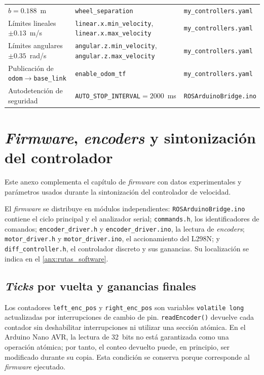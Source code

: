 \begin{appendices}
\begin{table}[H]
\begin{tabular}{p{3.5cm} p{6.3cm} p{4.1cm}}
$b=0.188$~m &
\texttt{wheel\_separation} &
\texttt{my\_controllers.yaml} \\

Límites lineales $\pm0.13$~m/s &
\texttt{linear.x.min\_velocity}, \texttt{linear.x.max\_velocity} &
\texttt{my\_controllers.yaml} \\

Límites angulares $\pm0.35$~rad/s &
\texttt{angular.z.min\_velocity}, \texttt{angular.z.max\_velocity} &
\texttt{my\_controllers.yaml} \\

Publicación de \texttt{odom}$\rightarrow$\texttt{base\_link} &
\texttt{enable\_odom\_tf} &
\texttt{my\_controllers.yaml} \\

Autodetención de seguridad &
\texttt{AUTO\_STOP\_INTERVAL}$=2000$~ms &
\texttt{ROSArduinoBridge.ino} \\
\bottomrule
\end{tabular}
\end{table}

\section{\texorpdfstring{\textit{Firmware}}{Firmware}, \texorpdfstring{\textit{encoders}}{encoders} y sintonización del controlador}
\label{anx:firmware}

Este anexo complementa el capítulo de \textit{firmware} con datos experimentales y parámetros usados durante la sintonización del controlador de velocidad.

El \textit{firmware} se distribuye en módulos independientes: \texttt{ROSArduinoBridge.ino} contiene el ciclo principal y el analizador serial; \texttt{commands.h}, los identificadores de comandos; \texttt{encoder\_driver.h} y \texttt{encoder\_driver.ino}, la lectura de \textit{encoders}; \texttt{motor\_driver.h} y \texttt{motor\_driver.ino}, el accionamiento del L298N; y \texttt{diff\_controller.h}, el controlador discreto y sus ganancias. Su localización se indica en el \ref{anx:rutas_software}.

\subsection{\texorpdfstring{\textit{Ticks}}{Ticks} por vuelta y ganancias finales}
\label{anx:pid_data}

Los contadores \texttt{left\_enc\_pos} y
\texttt{right\_enc\_pos} son variables \texttt{volatile long} actualizadas por
interrupciones de cambio de pin. \texttt{readEncoder()} devuelve cada contador
sin deshabilitar interrupciones ni utilizar una sección atómica. En el Arduino
Nano AVR, la lectura de 32~bits no está garantizada como una operación atómica;
por tanto, el conteo devuelto puede, en principio, ser modificado durante su
copia. Esta condición se conserva porque corresponde al \textit{firmware} ejecutado.


\end{appendices}
